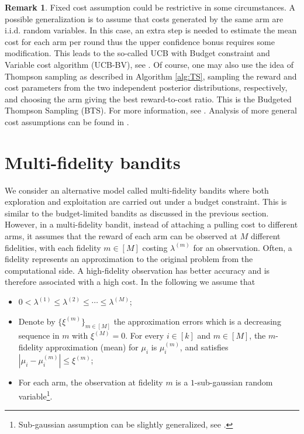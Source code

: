 \documentclass[letterpaper,10pt,openright,openany]{book}
\numberwithin{equation}{section}
\theoremstyle{plain}
\theoremstyle{definition}
\newtheorem{Rem}[Th]{Remark}
\begin{document}
\begin{Rem}
Fixed cost assumption could be restrictive in some circumstances. A possible generalization is to assume that costs generated by the same arm are i.i.d. random variables. In this case, an extra step is needed to estimate the mean cost for each arm per round thus the upper confidence bonus requires some modification. This leads to the so-called UCB with Budget constraint and Variable cost algorithm (UCB-BV),  see \cite{ding2013multi}. Of course, one may also use the idea of Thompson sampling as described in Algorithm \ref{alg:TS}, sampling the reward and cost parameters from the two independent posterior distributions, respectively, and choosing the arm giving the best reward-to-cost ratio. This is the Budgeted Thompson Sampling (BTS). For more information, see \cite{xia2015thompson}. Analysis of more general cost assumptions can be found in \cite{cayci2020budget}.  
\end{Rem}


\section{Multi-fidelity bandits}
We consider an alternative model called multi-fidelity bandits \cite{kandasamy2016multi} where both exploration and exploitation are carried out under a budget constraint. 
This is similar to the budget-limited bandits as discussed in the previous section. 
However, in a multi-fidelity bandit, instead of attaching a pulling cost to different arms, it assumes that the reward of each arm can be observed at $M$ different fidelities, with each fidelity $m\in [M]$ costing $\lambda^{(m)}$ for an observation. 
Often, a fidelity represents an approximation to the original problem from the computational side. 
A high-fidelity observation has better accuracy and is therefore associated with a high cost. 
In the following we assume that 
\begin{itemize}
\item $0<\lambda^{(1)}\leq\lambda^{(2)}\leq\cdots\leq\lambda^{(M)}$;
\item Denote by $\{\xi^{(m)}\}_{m\in [M]}$ the approximation errors which is a decreasing sequence in $m$ with $\xi^{(M)}=0$. 
For every $i\in [k]$ and $m\in [M]$, the $m$-fidelity approximation (mean) for $\mu_i$ is $\mu_i^{(m)}$, and satisfies  $|\mu_i-\mu_i^{(m)}|\leq\xi^{(m)}$;
\item For each arm, the observation at fidelity $m$ is a $1$-sub-gaussian random variable\footnote{Sub-gaussian assumption can be slightly generalized, see \cite{kandasamy2016multi}.}.
\end{itemize}
\end{document}
